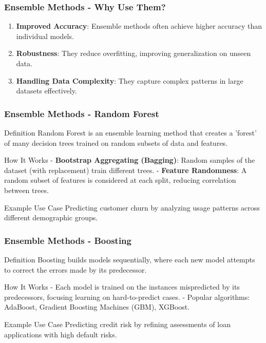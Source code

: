 \documentclass[aspectratio=169]{beamer}
\begin{document}
\begin{frame}[fragile]
    \frametitle{Ensemble Methods - Why Use Them?}
    \begin{enumerate}
        \item \textbf{Improved Accuracy}:
            Ensemble methods often achieve higher accuracy than individual models.
        \item \textbf{Robustness}:
            They reduce overfitting, improving generalization on unseen data.
        \item \textbf{Handling Data Complexity}:
            They capture complex patterns in large datasets effectively.
    \end{enumerate}
\end{frame}

\begin{frame}[fragile]
    \frametitle{Ensemble Methods - Random Forest}
    \begin{block}{Definition}
        Random Forest is an ensemble learning method that creates a 'forest' of many decision trees trained on random subsets of data and features.
    \end{block}

    \begin{block}{How It Works}
        - \textbf{Bootstrap Aggregating (Bagging)}: Random samples of the dataset (with replacement) train different trees.
        - \textbf{Feature Randomness}: A random subset of features is considered at each split, reducing correlation between trees.
    \end{block}
    
    \begin{block}{Example Use Case}
        Predicting customer churn by analyzing usage patterns across different demographic groups.
    \end{block}
\end{frame}

\begin{frame}[fragile]
    \frametitle{Ensemble Methods - Boosting}
    \begin{block}{Definition}
        Boosting builds models sequentially, where each new model attempts to correct the errors made by its predecessor.
    \end{block}

    \begin{block}{How It Works}
        - Each model is trained on the instances mispredicted by its predecessors, focusing learning on hard-to-predict cases.
        - Popular algorithms: AdaBoost, Gradient Boosting Machines (GBM), XGBoost.
    \end{block}

    \begin{block}{Example Use Case}
        Predicting credit risk by refining assessments of loan applications with high default risks.
    \end{block}
\end{frame}
\end{document}
